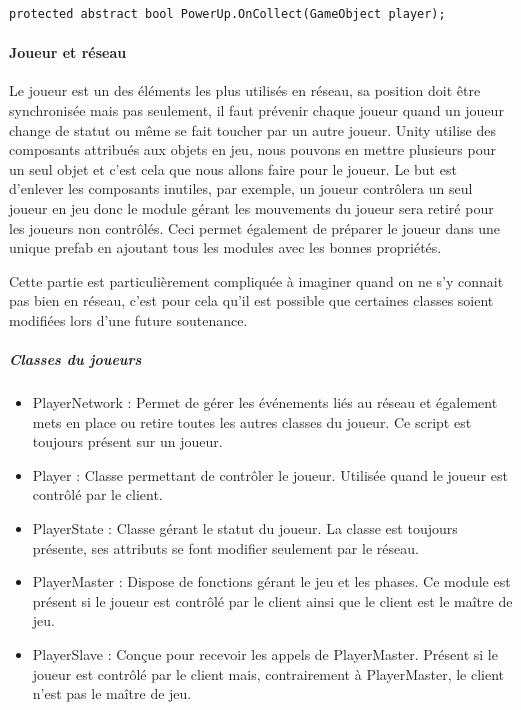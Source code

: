 \documentclass{article}
\begin{document}
\begin{lstlisting}
protected abstract bool PowerUp.OnCollect(GameObject player);
\end{lstlisting}

\paragraph{Joueur et réseau}

Le joueur est un des éléments les plus utilisés en réseau, sa position doit être synchronisée mais pas seulement, il faut prévenir chaque joueur quand un joueur change de statut ou même se fait toucher par un autre joueur. Unity utilise des composants attribués aux objets en jeu, nous pouvons en mettre plusieurs pour un seul objet et c'est cela que nous allons faire pour le joueur. Le but est d'enlever les composants inutiles, par exemple, un joueur contrôlera un seul joueur en jeu donc le module gérant les mouvements du joueur sera retiré pour les joueurs non contrôlés. Ceci permet également de préparer le joueur dans une unique prefab en ajoutant tous les modules avec les bonnes propriétés.

Cette partie est particulièrement compliquée à imaginer quand on ne s'y connait pas bien en réseau, c'est pour cela qu'il est possible que certaines classes soient modifiées lors d'une future soutenance.

\subparagraph{Classes du joueurs}

\begin{itemize}

\item PlayerNetwork : Permet de gérer les événements liés au réseau et également mets en place ou retire toutes les autres classes du joueur. Ce script est toujours présent sur un joueur.

\item Player : Classe permettant de contrôler le joueur. Utilisée quand le joueur est contrôlé par le client.

\item PlayerState : Classe gérant le statut du joueur. La classe est toujours présente, ses attributs se font modifier seulement par le réseau.

\item PlayerMaster : Dispose de fonctions gérant le jeu et les phases. Ce module est présent si le joueur est contrôlé par le client ainsi que le client est le maître de jeu.

\item PlayerSlave : Conçue pour recevoir les appels de PlayerMaster. Présent si le joueur est contrôlé par le client mais, contrairement à PlayerMaster, le client n'est pas le maître de jeu.

\end{itemize}
\end{document}
